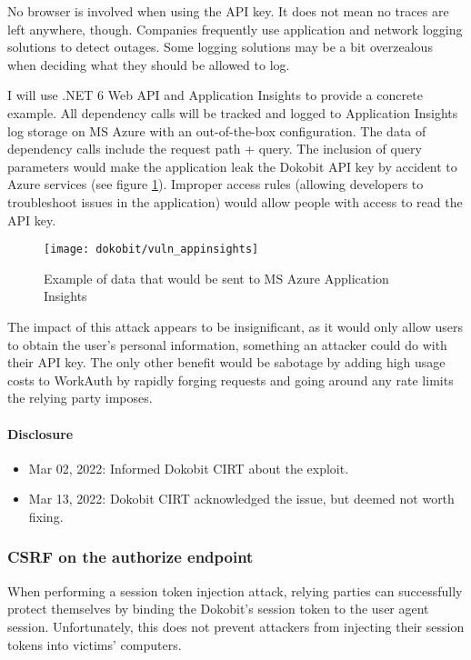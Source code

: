 No browser is involved when using the API key. It does not mean no traces are left anywhere, though. Companies frequently use application and network logging solutions to detect outages. Some logging solutions may be a bit overzealous when deciding what they should be allowed to log.

I will use .NET 6 Web API and Application Insights to provide a concrete example. All dependency calls will be tracked and logged to Application Insights log storage on MS Azure with an out-of-the-box configuration. The data of dependency calls include the request path + query. The inclusion of query parameters would make the application leak the Dokobit API key by accident to Azure services (see figure \ref{fig:dokobit-vuln-query}). Improper access rules (allowing developers to troubleshoot issues in the application) would allow people with access to read the API key.

\begin{figure}
  \centering
  \texttt{[image: dokobit/vuln\_appinsights]}
  \caption{Example of data that would be sent to MS Azure Application Insights}
  \label{fig:dokobit-vuln-query}
\end{figure}

The impact of this attack appears to be insignificant, as it would only allow users to obtain the user's personal information, something an attacker could do with their API key. The only other benefit would be sabotage by adding high usage costs to WorkAuth by rapidly forging requests and going around any rate limits the relying party imposes.

\paragraph{Disclosure}

\begin{itemize}
  \item Mar 02, 2022: Informed Dokobit CIRT about the exploit.
  \item Mar 13, 2022: Dokobit CIRT acknowledged the issue, but deemed not worth fixing.
\end{itemize}

\subsubsection{CSRF on the authorize endpoint}

When performing a session token injection attack, relying parties can successfully protect themselves by binding the Dokobit's session token to the user agent session. Unfortunately, this does not prevent attackers from injecting their session tokens into victims' computers.

